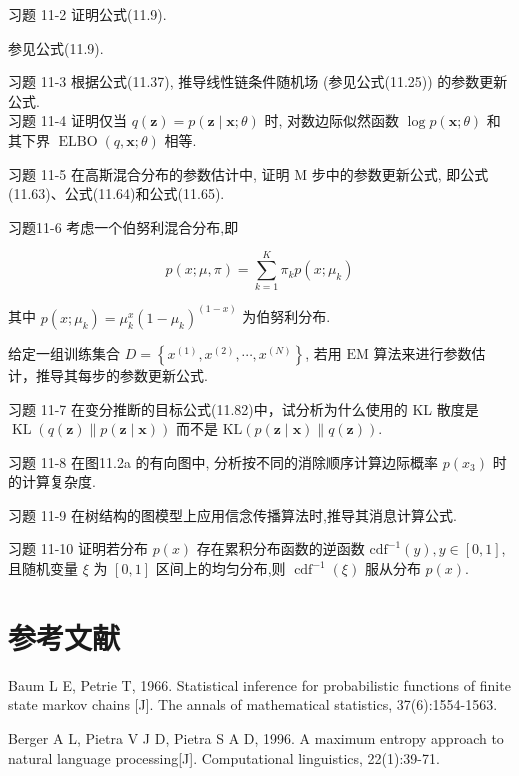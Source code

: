 \documentclass[10pt]{article}
\begin{document}
习题 11-2 证明公式(11.9).

参见公式(11.9).

习题 11-3 根据公式(11.37), 推导线性链条件随机场 (参见公式(11.25)) 的参数更新公式.\\
习题 11-4 证明仅当 $q(\boldsymbol{z})=p(\boldsymbol{z} \mid \boldsymbol{x} ; \theta)$ 时, 对数边际似然函数 $\log p(\boldsymbol{x} ; \theta)$ 和其下界 $\operatorname{ELBO}(q, \boldsymbol{x} ; \theta)$ 相等.

习题 11-5 在高斯混合分布的参数估计中, 证明 $\mathrm{M}$ 步中的参数更新公式, 即公式 (11.63)、公式(11.64)和公式(11.65).

习题11-6 考虑一个伯努利混合分布,即


\begin{equation*}
p(x ; \mu, \pi)=\sum_{k=1}^{K} \pi_{k} p\left(x ; \mu_{k}\right) \tag{11.126}
\end{equation*}


其中 $p\left(x ; \mu_{k}\right)=\mu_{k}^{x}\left(1-\mu_{k}\right)^{(1-x)}$ 为伯努利分布.

给定一组训练集合 $D=\left\{x^{(1)}, x^{(2)}, \cdots, x^{(N)}\right\}$, 若用 $\mathrm{EM}$ 算法来进行参数估计，推导其每步的参数更新公式.

习题 11-7 在变分推断的目标公式(11.82)中，试分析为什么使用的 KL 散度是 $\operatorname{KL}(q(\boldsymbol{z}) \| p(\boldsymbol{z} \mid \boldsymbol{x}))$ 而不是 $\mathrm{KL}(p(\boldsymbol{z} \mid \boldsymbol{x}) \| q(\boldsymbol{z}))$.

习题 11-8 在图11.2a 的有向图中, 分析按不同的消除顺序计算边际概率 $p\left(x_{3}\right)$ 时的计算复杂度.

习题 11-9 在树结构的图模型上应用信念传播算法时,推导其消息计算公式.

习题 11-10 证明若分布 $p(x)$ 存在累积分布函数的逆函数 $\mathrm{cdf}^{-1}(y), y \in[0,1]$, 且随机变量 $\xi$ 为 $[0,1]$ 区间上的均匀分布,则 $\operatorname{cdf}^{-1}(\xi)$ 服从分布 $p(x)$.

\section*{参考文献}
Baum L E, Petrie T, 1966. Statistical inference for probabilistic functions of finite state markov chains [J]. The annals of mathematical statistics, 37(6):1554-1563.

Berger A L, Pietra V J D, Pietra S A D, 1996. A maximum entropy approach to natural language processing[J]. Computational linguistics, 22(1):39-71.
\end{document}
